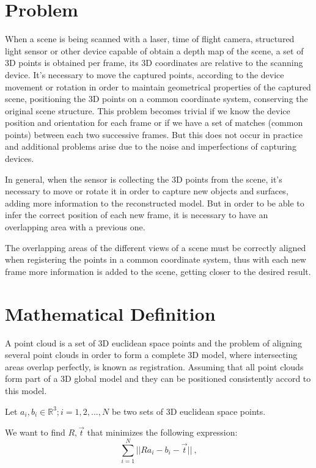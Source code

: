 \section{Problem}

When a scene is being scanned with a laser, time of flight camera, structured 
light sensor or other device capable of obtain a depth map of the scene,
 a set of 3D points is obtained per frame, its 3D coordinates 
are relative to the scanning device. It's necessary to move the captured points, 
according to the device movement or rotation in order to maintain geometrical properties of the captured scene,
 positioning the 3D points on a common coordinate system, conserving 
the original scene structure. This problem becomes trivial if we know the device position and orientation 
for each frame or if we have a set of matches (common points)  between each two successive 
frames. But this does not occur in practice and additional problems arise due 
to the noise and imperfections of capturing devices.


In general, when the sensor is collecting the 3D points from the scene, 
 it's necessary to move or rotate it in order to capture new objects and surfaces,
 adding more information to the reconstructed model. But in order to be 
able to infer the correct position of each new frame, it is necessary to have an overlapping area with a previous one. 
 
The overlapping areas of the different views of a scene must be correctly 
aligned when registering the points in a common coordinate system, 
thus with each new frame more information is added to the scene, 
getting closer to the desired result. 

\section{Mathematical Definition}

A point cloud is a set of 3D euclidean space points and the problem of aligning several point clouds 
in order to form a complete 3D model, where intersecting areas overlap perfectly, 
is known as registration. Assuming that all point clouds form part of a 3D global model and they can be 
 positioned  consistently accord to this model.

Let  ${a_i},{b_i} \in \mathbb{R}^3;i = 1,2,...,N$ be two sets of 3D euclidean space points.

We want to find $R,\vec{t}$ that minimizes the following expression:
$$
\sum\limits_{i=1}^N || Ra_i - b_i - \vec{t} || \ ,
$$

